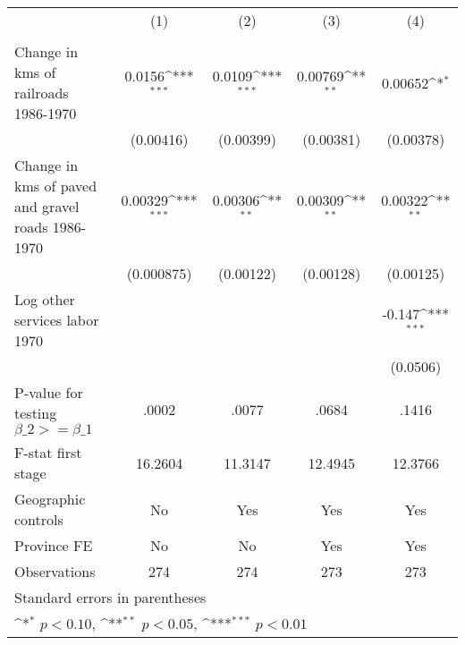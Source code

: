 {
\def\sym#1{\ifmmode^{#1}\else\(^{#1}\)\fi}
\begin{tabular}{l*{4}{c}}
\hline\hline
                &\multicolumn{1}{c}{(1)}&\multicolumn{1}{c}{(2)}&\multicolumn{1}{c}{(3)}&\multicolumn{1}{c}{(4)}\\
                &\multicolumn{1}{c}{}&\multicolumn{1}{c}{}&\multicolumn{1}{c}{}&\multicolumn{1}{c}{}\\
\hline
Change in kms of railroads 1986-1970&   0.0156\sym{***}&   0.0109\sym{***}&  0.00769\sym{**} &  0.00652\sym{*}  \\
                &(0.00416)         &(0.00399)         &(0.00381)         &(0.00378)         \\
[1em]
Change in kms of paved and gravel roads 1986-1970&  0.00329\sym{***}&  0.00306\sym{**} &  0.00309\sym{**} &  0.00322\sym{**} \\
                &(0.000875)         &(0.00122)         &(0.00128)         &(0.00125)         \\
[1em]
Log other services labor 1970&                  &                  &                  &   -0.147\sym{***}\\
                &                  &                  &                  & (0.0506)         \\
\hline
P-value for testing $\beta\_{2} >= \beta\_{1}$&    .0002         &    .0077         &    .0684         &    .1416         \\
F-stat first stage&  16.2604         &  11.3147         &  12.4945         &  12.3766         \\
Geographic controls&       No         &      Yes         &      Yes         &      Yes         \\
Province FE     &       No         &       No         &      Yes         &      Yes         \\
Observations    &      274         &      274         &      273         &      273         \\
\hline\hline
\multicolumn{5}{l}{\footnotesize Standard errors in parentheses}\\
\multicolumn{5}{l}{\footnotesize \sym{*} \(p<0.10\), \sym{**} \(p<0.05\), \sym{***} \(p<0.01\)}\\
\end{tabular}
}
